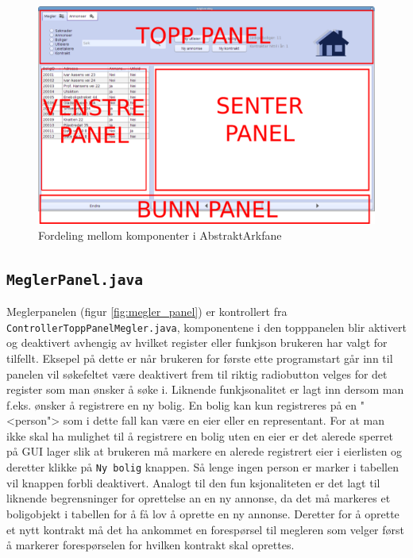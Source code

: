 \begin{figure}[ht]
 \includegraphics[width=\textwidth,height=\textheight,keepaspectratio]{./img/produktdokumentasjon/swing_componenter/AbstraktArkfane.png}
 \caption{Fordeling mellom komponenter i AbstraktArkfane}
 \label{fig:asbtarkfane}
\end{figure}



\subsection{\texttt{MeglerPanel.java}} \label{subsec:meglerpanel}
Meglerpanelen (figur \ref{fig:megler_panel}) er kontrollert fra \texttt{ControllerToppPanelMegler.java}, komponentene i den topppanelen blir aktivert og deaktivert avhengig av hvilket register eller funkjson brukeren har valgt for tilfellt. Eksepel på dette er når brukeren for første ette programstart går inn til panelen vil søkefeltet være deaktivert frem til riktig radiobutton velges for det register som man ønsker å søke i. Liknende funkjsonalitet er lagt inn dersom man f.eks. ønsker å registrere en ny bolig. En bolig kan kun registreres på en "<person"> som i dette fall kan være en eier eller en representant. For at man ikke skal ha mulighet til å registrere en bolig uten en eier er det alerede sperret på GUI lager slik at brukeren må markere en alerede registrert eier i eierlisten og deretter klikke på \texttt{Ny bolig} knappen. Så lenge ingen person er marker i tabellen vil knappen forbli deaktivert. Analogt til den fun ksjonaliteten er det lagt til liknende begrensninger for oprettelse an en ny annonse, da det må markeres et boligobjekt i tabellen for å få lov å oprette en ny annonse. Deretter for å oprette et nytt kontrakt må det ha ankommet en forespørsel til megleren som velger først å markerer forespørselen for hvilken kontrakt skal oprettes. 

